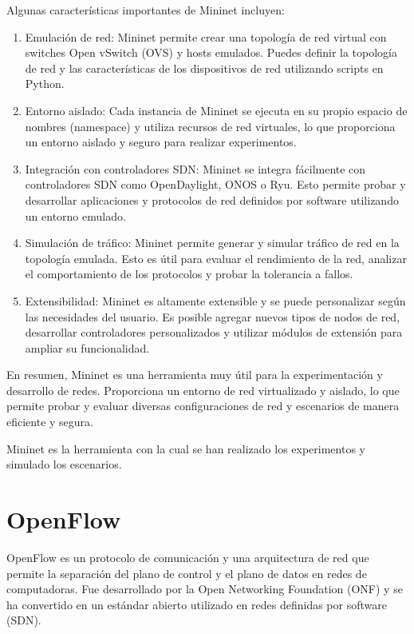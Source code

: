 \documentclass[a4paper, 12pt]{book}
\begin{document}
	Algunas características importantes de Mininet incluyen:
	
	\begin{enumerate}
		\item 	Emulación de red: Mininet permite crear una topología de red virtual con switches Open vSwitch (OVS) y hosts emulados. Puedes definir la topología de red y las características de los dispositivos de red utilizando scripts en Python.
		\item 	Entorno aislado: Cada instancia de Mininet se ejecuta en su propio espacio de nombres (namespace) y utiliza recursos de red virtuales, lo que proporciona un entorno aislado y seguro para realizar experimentos.
		\item 	Integración con controladores SDN: Mininet se integra fácilmente con controladores SDN como OpenDaylight, ONOS o Ryu. Esto permite probar y desarrollar aplicaciones y protocolos de red definidos por software utilizando un entorno emulado.
		\item 	Simulación de tráfico: Mininet permite generar y simular tráfico de red en la topología emulada. Esto es útil para evaluar el rendimiento de la red, analizar el comportamiento de los protocolos y probar la tolerancia a fallos.
		\item   Extensibilidad: Mininet es altamente extensible y se puede personalizar según las necesidades del usuario. Es posible agregar nuevos tipos de nodos de red, desarrollar controladores personalizados y utilizar módulos de extensión para ampliar su funcionalidad.
	\end{enumerate}
	
	
	En resumen, Mininet es una herramienta muy útil para la experimentación y desarrollo de redes. Proporciona un entorno de red virtualizado y aislado, lo que permite probar y evaluar diversas configuraciones de red y escenarios de manera eficiente y segura.
	
	Mininet es la herramienta con la cual se han realizado los experimentos y simulado los escenarios.
	
	\section{OpenFlow}
	\label{sec:openflow}
	
	
	OpenFlow es un protocolo de comunicación y una arquitectura de red que permite la separación del plano de control y el plano de datos en redes de computadoras. Fue desarrollado por la Open Networking Foundation (ONF) y se ha convertido en un estándar abierto utilizado en redes definidas por software (SDN).
	
\end{document}
